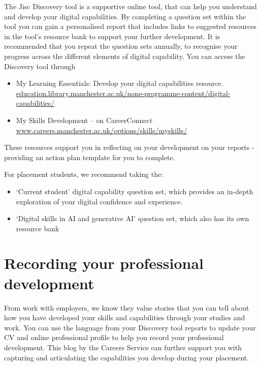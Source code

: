 \documentclass[
]{book}
\providecommand{\tightlist}{%
  \setlength{\itemsep}{0pt}\setlength{\parskip}{0pt}}
\begin{document}
The Jisc Discovery tool is a supportive online tool, that can help you understand and develop your digital capabilities. By completing a question set within the tool you can gain a personalised report that includes
links to suggested resources in the tool's resource bank to support your further development. It is recommended that you repeat the question sets annually, to recognise your progress across the different elements of digital capability. You can access the Discovery tool through

\begin{itemize}
\tightlist
\item
  My Learning Essentials: Develop your digital capabilities resource. \href{https://www.education.library.manchester.ac.uk/none-programme-content/digital-capabilities/}{education.library.manchester.ac.uk/none-programme-content/digital-capabilities/}
\item
  My Skills Development -- on CareerConnect \href{https://www.careers.manchester.ac.uk/options/skills/myskills/}{www.careers.manchester.ac.uk/options/skills/myskills/} \citep{audit}
\end{itemize}

These resources support you in reflecting on your development on your reports - providing an action plan template for you to complete.

For placement students, we recommend taking the:

\begin{itemize}
\tightlist
\item
  `Current student' digital capability question set, which provides an in-depth exploration of your digital confidence and experience.
\item
  `Digital skills in AI and generative AI' question set, which also has its own resource bank
\end{itemize}

\section{Recording your professional development}\label{development}

From work with employers, we know they value stories that you can tell about how you have developed your skills and capabilities through your studies and work. You can use the language from your Discovery tool reports to update your CV and online professional profile to help you record your professional development. This blog by the Careers Service can further support you with capturing and articulating the capabilities you develop during your placement. \citep{conway}
\end{document}
